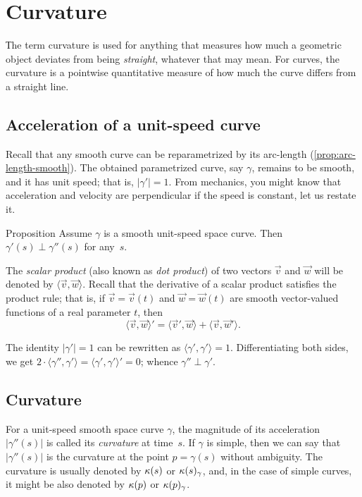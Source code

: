 \chapter{Curvature}
\label{chap:curve-curvature}

Тhe term curvature is used for anything that measures how much a geometric object deviates from being \textit{straight}, whatever that may mean.
For curves, the curvature is a pointwise quantitative measure of how much the curve differs from a straight line.




\section{Acceleration of a unit-speed curve}

Recall that any smooth curve can be reparametrized by its arc-length (\ref{prop:arc-length-smooth}).
The obtained parametrized curve, say $\gamma$, remains to be smooth, and it has unit speed; 
that is, $|\gamma'|=1$.
From mechanics, you might know that acceleration and velocity are perpendicular if the speed is constant,
let us restate it.



\begin{thm}{Proposition}\label{prop:a'-pertp-a''}
Assume $\gamma$ is a smooth unit-speed space curve.
Then $\gamma'(s)\perp \gamma''(s)$ for any~$s$.
\end{thm}

The \emph{scalar product} (also known as \textit{dot product}) of two vectors $\vec v$ and $\vec w$ will be denoted by $\langle \vec v,\vec w\rangle$.
Recall that the derivative of a scalar product satisfies the product rule;
that is, if $\vec v=\vec v(t)$ and $\vec w=\vec w(t)$ are smooth vector-valued functions of a real parameter $t$, then
\[\langle \vec v,\vec w\rangle'=\langle \vec v',\vec w\rangle+\langle \vec v,\vec w'\rangle.\]

The identity $|\gamma'|=1$ can be rewritten as $\langle\gamma',\gamma'\rangle=1$.
Differentiating both sides, we get
$2\cdot\langle\gamma'',\gamma'\rangle=\langle\gamma',\gamma'\rangle'=0$;
whence $\gamma''\perp\gamma'$.
\qeds

\section{Curvature}\label{sec:curvature}

For a unit-speed smooth space curve $\gamma$, the magnitude of its acceleration $|\gamma''(s)|$ is called its \emph{curvature} at  time~$s$.
If $\gamma$ is simple, then we can say that $|\gamma''(s)|$ is the curvature at the point $p=\gamma(s)$ without ambiguity.
The curvature is usually denoted by $\kappa(s)$ or $\kappa(s)_\gamma$, and, in the case of simple curves, it might be also denoted by $\kappa(p)$ or $\kappa(p)_\gamma$.

